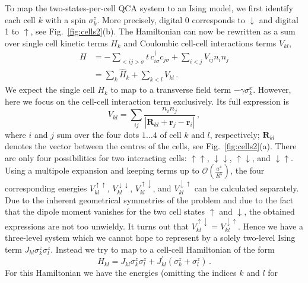 To map the two-states-per-cell QCA system to an Ising model, we first identify
each cell $k$ with a spin $\sigma^z_k$. More precisely, digital 0
corresponds to $\downarrow$ and digital 1 to $\uparrow$, see
Fig.~\ref{fig:cells2}(b). The Hamiltonian can now be rewritten as a sum over
single cell kinetic terms $H_k$ and Coulombic cell-cell interactions terms
$V_{kl}$, 
%
\begin{equation}
\begin{split}
  H &= 
      - \sum_{<ij>\sigma} t \, c^{\dag}_{i\sigma} c_{j\sigma} + 
      \sum_{i<j} V_{ij} n_i n_j \\
    &= 
      \sum_{k} \hat{H}_k + \sum_{k<l} V_{kl} \, .
\end{split}
\end{equation}
%
We expect the single cell $H_k$ to map to a transverse field term $-\gamma
\sigma^x_k$. However, here we focus on the cell-cell interaction term exclusively.
Its full expression is
%
\begin{equation}
  V_{kl} = 
  \sum_{ij} \frac{n_i n_j}
  {\left| \bm{R}_{kl} + \bm{r}_j - \bm{r}_i \right|} \, ,
\end{equation}
%
where $i$ and $j$ sum over the four dots $1\ldots4$ of cell $k$ and $l$,
respectively; $\bm{R}_{kl}$ denotes the vector between the centres of the cells,
see Fig.~\ref{fig:cells2}(a). There are only four possibilities for
two interacting cells: $\uparrow\uparrow$, $\downarrow\downarrow$,
$\uparrow\downarrow$, and $\downarrow\uparrow$. Using a multipole expansion
and keeping terms up to $\mathcal{O}\left(\frac{a^4}{R^5}\right)$, the four
corresponding energies $V^{\uparrow\uparrow}_{kl}$, $V^{\downarrow\downarrow}_{kl}$,
$V^{\uparrow\downarrow}_{kl}$, and $V^{\downarrow\uparrow}_{kl}$ can be calculated
separately. Due to the inherent geometrical symmetries of the problem and due to
the fact that the dipole moment vanishes for the two cell states $\uparrow$ and
$\downarrow$, the obtained expressions are not too unwieldy. It turns out that
$V^{\uparrow\downarrow}_{kl} = V^{\downarrow\uparrow}_{kl}$. Hence we have a
three-level system which we cannot hope to represent by a solely two-level
Ising term $J_{kl} \sigma^z_k \sigma^z_l$. Instead we try to map to a
cell-cell Hamiltonian of the form
%
\begin{equation}
  H_{kl} = 
  J_{kl} \sigma^z_k \sigma^z_l + 
  J^{\prime}_{kl} \left( \sigma^z_k + \sigma^z_l \right) \, .
\end{equation}
%
For this Hamiltonian we have the energies (omitting the indices $k$ and $l$ for
